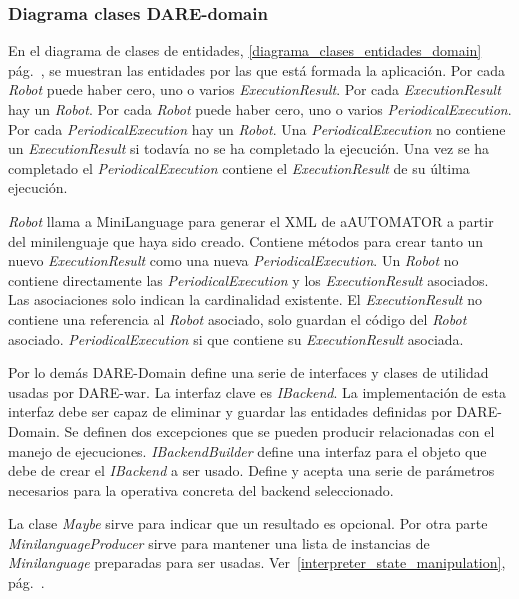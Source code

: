 \subsubsection{Diagrama clases DARE-domain}

En el diagrama de clases de entidades,
\ref{diagrama_clases_entidades_domain}
pág.~\pageref{diagrama_clases_entidades_domain}, se muestran las
entidades por las que está formada la aplicación. Por cada
\emph{Robot} puede haber cero, uno o varios
\emph{ExecutionResult}. Por cada \emph{ExecutionResult} hay un
\emph{Robot}. Por cada \emph{Robot} puede haber cero, uno o varios
\emph{PeriodicalExecution}. Por cada \emph{PeriodicalExecution} hay un
\emph{Robot}. Una \emph{PeriodicalExecution} no contiene un
\emph{ExecutionResult} si todavía no se ha completado la
ejecución. Una vez se ha completado el \emph{PeriodicalExecution}
contiene el \emph{ExecutionResult} de su última ejecución.

\emph{Robot} llama a MiniLanguage para generar el XML de aAUTOMATOR a
partir del minilenguaje que haya sido creado. Contiene métodos para
crear tanto un nuevo \emph{ExecutionResult} como una nueva
\emph{PeriodicalExecution}. Un \emph{Robot} no contiene directamente
las \emph{PeriodicalExecution} y los \emph{ExecutionResult}
asociados. Las asociaciones solo indican la cardinalidad existente. El
\emph{ExecutionResult} no contiene una referencia al \emph{Robot}
asociado, solo guardan el código del \emph{Robot}
asociado. \emph{PeriodicalExecution} si que contiene su
\emph{ExecutionResult} asociada.

Por lo demás DARE-Domain define una serie de interfaces y clases de
utilidad usadas por DARE-war. La interfaz clave es \emph{IBackend}. La
implementación de esta interfaz debe ser capaz de eliminar y guardar
las entidades definidas por DARE-Domain. Se definen dos excepciones
que se pueden producir relacionadas con el manejo de
ejecuciones. \emph{IBackendBuilder} define una interfaz para el objeto
que debe de crear el \emph{IBackend} a ser usado. Define y acepta una
serie de parámetros necesarios para la operativa concreta del backend
seleccionado.

La clase \emph{Maybe} sirve para indicar que un resultado es
opcional. Por otra parte \emph{MinilanguageProducer} sirve para mantener una
lista de instancias de \emph{Minilanguage} preparadas para ser
usadas. Ver~\ref{interpreter_state_manipulation},
pág.~\pageref{interpreter_state_manipulation}.

